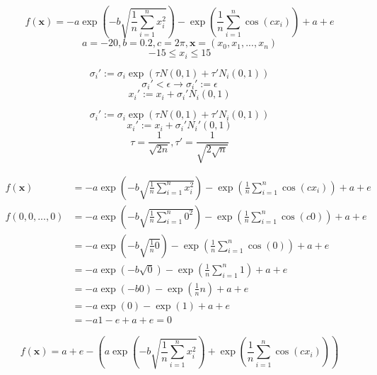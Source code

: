 \documentclass{article}
\begin{document}
$$ f(\bm{x}) = -a \exp{\left( -b \sqrt{\frac{1}{n} \sum_{i=1}^{n}{x_i^2}} \right) } - \exp{ \left( \frac{1}{n} \sum_{i=1}^{n}{\cos{(c x_i)}} \right) } + a + e $$
$$ a = -20, b = 0.2, c = 2 \pi, \bm{x} = (x_0, x_1, ... , x_n)$$
$$ -15 \leq x_i \leq 15 $$

$$ \sigma_i' := \sigma_i \exp{\left( \tau N(0,1) + \tau' N_i(0,1) \right) } $$
$$ \sigma_i' < \epsilon \rightarrow \sigma_i' := \epsilon $$
$$ x_i' := x_i + \sigma_i' N_i(0,1) $$


$$ \sigma_i' := \sigma_i \exp{\left( \tau N(0,1) + \tau' N_i(0,1) \right) } $$
$$ x_i' := x_i + \sigma_i' N_i'(0,1) $$
$$ \tau = \frac{1}{\sqrt{2n}}, \tau' = \frac{1}{\sqrt{2\sqrt{n}}}$$

\begin{equation}
  \begin{split}
    f(\bm{x}) & = -a \exp{\left( -b \sqrt{\frac{1}{n} \sum_{i=1}^{n}{x_i^2}} \right) } - \exp{ \left( \frac{1}{n} \sum_{i=1}^{n}{\cos{(c x_i)}} \right) } + a + e \\
    f(0,0,...,0) & = -a \exp{\left( -b \sqrt{\frac{1}{n} \sum_{i=1}^{n}{0^2}} \right) } - \exp{ \left( \frac{1}{n} \sum_{i=1}^{n}{\cos{(c 0)}} \right) } + a + e  \\
    & = -a \exp{\left( -b \sqrt{\frac{1}{n} 0} \right) } - \exp{ \left( \frac{1}{n} \sum_{i=1}^{n}{\cos{(0)}} \right) } + a + e \\
    & = -a \exp{\left( -b \sqrt{0} \right) } - \exp{ \left( \frac{1}{n} \sum_{i=1}^{n}{1} \right) } + a + e \\
    & = -a \exp{\left( -b 0 \right) } - \exp{ \left( \frac{1}{n} n \right) } + a + e \\
    & = -a \exp{\left( 0 \right) } - \exp{ \left( 1 \right) } + a + e \\
    & = -a 1 - e + a + e = 0
  \end{split}
\end{equation}

$$ f(\bm{x}) = a + e - \left( a \exp{\left( -b \sqrt{\frac{1}{n} \sum_{i=1}^{n}{x_i^2}} \right) } + \exp{ \left( \frac{1}{n} \sum_{i=1}^{n}{\cos{(c x_i)}} \right) } \right) $$
\end{document}
